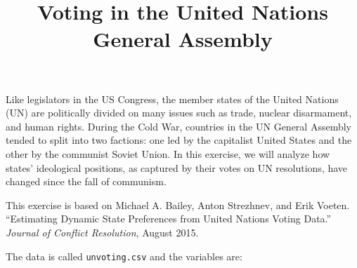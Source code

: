 \documentclass[]{article}
\title{Voting in the United Nations General Assembly}
\author{}
\date{}
\begin{document}
\maketitle


Like legislators in the US Congress, the member states of the United
Nations (UN) are politically divided on many issues such as trade,
nuclear disarmament, and human rights. During the Cold War, countries in
the UN General Assembly tended to split into two factions: one led by
the capitalist United States and the other by the communist Soviet
Union. In this exercise, we will analyze how states' ideological
positions, as captured by their votes on UN resolutions, have changed
since the fall of communism.

This exercise is based on Michael A. Bailey, Anton Strezhnev, and Erik
Voeten. ``Estimating Dynamic State Preferences from United Nations
Voting Data.'' \emph{Journal of Conflict Resolution}, August 2015.

The data is called \texttt{unvoting.csv} and the variables are:
\end{document}
